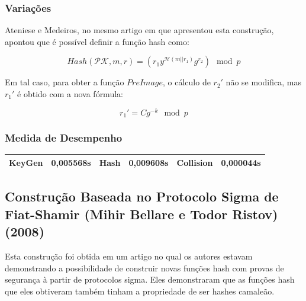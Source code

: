 \documentclass[a4paper]{article}
\begin{document}
%




\subsubsection{Variações}

Ateniese e Medeiros, no mesmo artigo em que apresentou esta construção,
apontou que é possível definir a função hash como:

$$ Hash(\mathcal{PK}, m, r) =
\left(r_1y^{\mathcal{H}(m||r_1)}g^{r_2} \right)\mod p
$$

Em tal caso, para obter a função $PreImage$, o cálculo de $r_2'$
não se modifica, mas $r_1'$ é obtido com a nova fórmula:

$$
r_1'=Cg^{-k} \mod p
$$

\subsubsection{Medida de Desempenho}

\begin{center}
\begin{tabular}{|c|c|c|c|c|c|}
  \hline
  KeyGen & 0,005568s & Hash & 0,009608s & Collision & 0,000044s\\
  \hline
\end{tabular}
\end{center}

\subsection{Construção Baseada no Protocolo Sigma de Fiat-Shamir
  (Mihir Bellare e Todor Ristov) (2008)\cite{sigma}}

Esta construção foi obtida em um artigo no qual os autores estavam
demonstrando a possibilidade de construir novas funções hash com
provas de segurança à partir de protocolos sigma. Eles demonstraram
que as funções hash que eles obtiveram também tinham a propriedade de
ser hashes camaleão.
\end{document}
